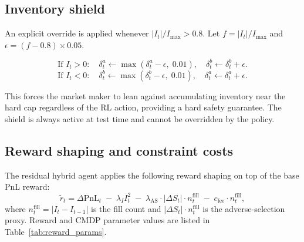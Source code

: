 \documentclass[11pt]{article}
\newcommand{\PnL}{\mathrm{PnL}}
\begin{document}
\subsection{Inventory shield}
\label{sec:shield}

An explicit override is applied whenever $|I_t|/I_{\max} > 0.8$.
Let $f = |I_t|/I_{\max}$ and $\epsilon = (f - 0.8) \times 0.05$.

\begin{equation}
  \text{If } I_t > 0: \quad
  \delta^a_t \leftarrow \max(\delta^a_t - \epsilon,\; 0.01),\quad
  \delta^b_t \leftarrow \delta^b_t + \epsilon.
\end{equation}
\begin{equation}
  \text{If } I_t < 0: \quad
  \delta^b_t \leftarrow \max(\delta^b_t - \epsilon,\; 0.01),\quad
  \delta^a_t \leftarrow \delta^a_t + \epsilon.
\end{equation}

This forces the market maker to lean against accumulating inventory near
the hard cap regardless of the RL action, providing a hard safety
guarantee. The shield is always active at test time and cannot be
overridden by the policy.

\subsection{Reward shaping and constraint costs}

The residual hybrid agent applies the following reward shaping on top of the
base PnL reward:
\begin{equation}
  \tilde{r}_t = \Delta\PnL_t
    \;-\; \lambda_I I_t^2
    \;-\; \lambda_{\text{AS}} \cdot |\Delta S_t| \cdot n^{\text{fill}}_t
    \;-\; c_{\text{fee}} \cdot n^{\text{fill}}_t,
  \label{eq:reward_shaping}
\end{equation}
where $n^{\text{fill}}_t = |I_t - I_{t-1}|$ is the fill count and
$|\Delta S_t| \cdot n^{\text{fill}}_t$ is the adverse-selection proxy.
Reward and CMDP parameter values are listed in Table~\ref{tab:reward_params}.
\end{document}
